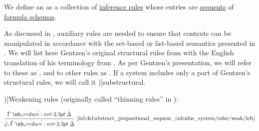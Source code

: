 \begin{definition}\label{def:abstract_propositional_sequent_calculus_system}\mimprovised
  We define an  as a collection of \hyperref[def:inference_rule]{inference rules} whose entries are \hyperref[def:sequent]{sequents} of \hyperref[def:propositional_formula_schema]{formula schemas}.

  As discussed in , auxiliary rules are needed to ensure that contexts can be manipulated in accordance with the set-based or list-based semantics presented in . We will list here Gentzen's original structural rules from \cite[192]{Gentzen1935LogischeSchließen} with the English translation of his terminology from \cite[296]{Gentzen1964LogicalDeduction}. As per Gentzen's presentation, we will refer to these as , and to other rules as . If a system includes only a part of Gentzen's structural rules, we will call it \term[en=substructural (\cite[91]{TroelstraSchwichtenberg2000Proofs})]{substructural}.

  \begin{thmenum}
     \term[ru=правила добавления (\cite[217]{КолмогоровДрагалин2006Логика})]{Weakening rules} (originally called \enquote{thinning rules} in \cite[296]{Gentzen1964LogicalDeduction}):
    \begin{paracol}{2}
      \begin{leftcolumn}
        \begin{equation*}\taglabel[\ensuremath{ \logic{Weak}_L }]{inf:def:abstract_propositional_sequent_calculus_system/rules/weak/left}
          \begin{prooftree}
            \hypo{ \syn\Gamma \synvdash \syn\Delta }
            \infer1[\ref{inf:def:abstract_propositional_sequent_calculus_system/rules/weak/left}]{ \syn\varphi, \syn\Gamma \synvdash \syn\Delta }
          \end{prooftree}
        \end{equation*}
      \end{leftcolumn}


\end{paracol}
\end{thmenum}
\end{definition}
